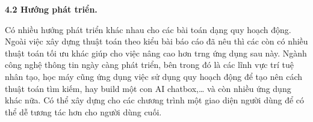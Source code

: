 
\bigskip
\changefontsizes{14pt}

\setlength{\parindent}{0.0cm}
\textbf{4.2 Hướng phát triển.}

\smallskip
\changefontsizes{13pt}

\setlength{\parindent}{1cm}
Có nhiều hướng phát triển khác nhau cho các bài toán dạng quy hoạch động. Ngoài việc xây dựng thuật toán theo kiểu bài báo cáo đã nêu thì các còn có nhiều thuật toán tối ưu khác giúp cho việc nâng cao hơn trng ứng dụng sau này. Ngành công nghệ thông tin ngày càng phát triển, bên trong đó là các lĩnh vực trí tuệ nhân tạo, học máy cũng ứng dụng việc sử dụng quy hoạch động để tạo nên cách thuật toán tìm kiếm, hay build một con AI chatbox,… và còn nhiều ứng dụng khác nữa. Có thể xây dựng cho các chương trình một giao diện người dùng để có thể dễ tương tác hơn cho người dùng cuối.

